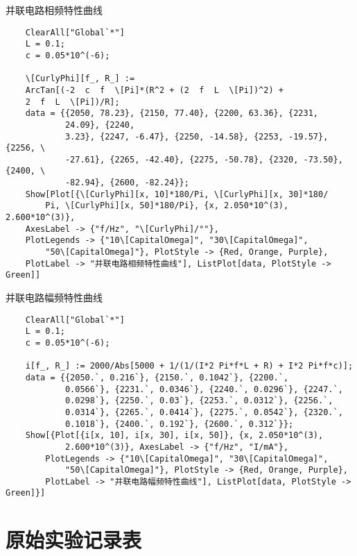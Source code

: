 \documentclass[11pt]{article}
\begin{document}
并联电路相频特性曲线
\begin{lstlisting}
	ClearAll["Global`*"]
	L = 0.1;
	c = 0.05*10^(-6);
	
	\[CurlyPhi][f_, R_] := 
	ArcTan[(-2  c  f  \[Pi]*(R^2 + (2  f  L  \[Pi])^2) + 
	2  f  L  \[Pi])/R];
	data = {{2050, 78.23}, {2150, 77.40}, {2200, 63.36}, {2231, 
			24.09}, {2240, 
			3.23}, {2247, -6.47}, {2250, -14.58}, {2253, -19.57}, {2256, \
			-27.61}, {2265, -42.40}, {2275, -50.78}, {2320, -73.50}, {2400, \
			-82.94}, {2600, -82.24}};
	Show[Plot[{\[CurlyPhi][x, 10]*180/Pi, \[CurlyPhi][x, 30]*180/
		Pi, \[CurlyPhi][x, 50]*180/Pi}, {x, 2.050*10^(3), 2.600*10^(3)}, 
	AxesLabel -> {"f/Hz", "\[CurlyPhi]/°"}, 
	PlotLegends -> {"10\[CapitalOmega]", "30\[CapitalOmega]", 
		"50\[CapitalOmega]"}, PlotStyle -> {Red, Orange, Purple}, 
	PlotLabel -> "并联电路相频特性曲线"], ListPlot[data, PlotStyle -> Green]]
\end{lstlisting}

并联电路幅频特性曲线
\begin{lstlisting}
	ClearAll["Global`*"]
	L = 0.1;
	c = 0.05*10^(-6);
	
	i[f_, R_] := 2000/Abs[5000 + 1/(1/(I*2 Pi*f*L + R) + I*2 Pi*f*c)];
	data = {{2050.`, 0.216`}, {2150.`, 0.1042`}, {2200.`, 
			0.0566`}, {2231.`, 0.0346`}, {2240.`, 0.0296`}, {2247.`, 
			0.0298`}, {2250.`, 0.03`}, {2253.`, 0.0312`}, {2256.`, 
			0.0314`}, {2265.`, 0.0414`}, {2275.`, 0.0542`}, {2320.`, 
			0.1018`}, {2400.`, 0.192`}, {2600.`, 0.312`}};
	Show[{Plot[{i[x, 10], i[x, 30], i[x, 50]}, {x, 2.050*10^(3), 
			2.600*10^(3)}, AxesLabel -> {"f/Hz", "I/mA"}, 
		PlotLegends -> {"10\[CapitalOmega]", "30\[CapitalOmega]", 
			"50\[CapitalOmega]"}, PlotStyle -> {Red, Orange, Purple}, 
		PlotLabel -> "并联电路幅频特性曲线"], ListPlot[data, PlotStyle -> Green]}]
\end{lstlisting}

\section{原始实验记录表}
	
\end{document}
